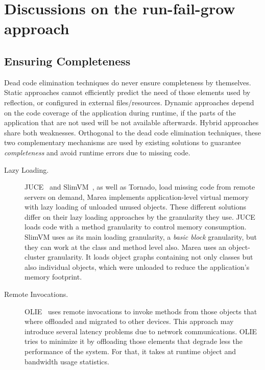 \section{Discussions on the run-fail-grow approach} \label{sec:discussion}

\subsection{Ensuring Completeness} \label{section:safety}

Dead code elimination techniques do never ensure completeness by themselves. Static approaches cannot efficiently predict the need of those elements used by reflection, or configured in external files/resources. Dynamic approaches depend on the code coverage of the application during runtime, \ie if the parts of the application that are not used will be not available afterwards. Hybrid approaches share both weaknesses. Orthogonal to the dead code elimination techniques, these two complementary mechanisms are used by existing solutions to guarantee \emph{completeness} and avoid runtime errors due to missing code.

\begin{description}
\item[Lazy Loading.] JUCE~\cite{Popa04a,Teod01a} and SlimVM~\cite{Kers09a, Wagn11a}, as well as Tornado, load missing code from remote servers on demand, Marea\cite{Mart12a} implements application-level virtual memory with lazy loading of unloaded unused objects. These different solutions differ on their lazy loading approaches by the granularity they use. JUCE loads code with a method granularity to control memory consumption. SlimVM uses as its main loading granularity, a \emph{basic block} granularity, but they can work at the class and method level also. Marea uses an object-cluster granularity. It loads object graphs containing not only classes but also individual objects, which were unloaded to reduce the application's memory footprint.
\item[Remote Invocations.] OLIE~\cite{Gu03a} uses remote invocations to invoke methods from those objects that where offloaded and migrated to other devices. This approach may introduce several latency problems due to network communications. OLIE tries to minimize it by offloading those elements that degrade less the performance of the system. For that, it takes at runtime object and bandwidth usage statistics.
\end{description}

